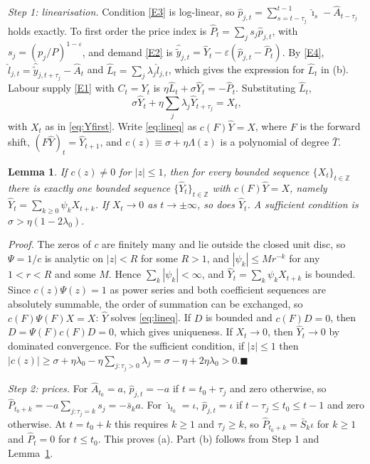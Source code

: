 \documentclass[11pt]{article}
\newtheorem{lemma}{Lemma}
\theoremstyle{definition}
\begin{document}
\emph{Step 1: linearisation.} Condition \eqref{E3} is log-linear, so
$\hat p_{j,t}=\sum_{s=t-\tau_j}^{t-1}\hat\imath_s-\hat A_{t-\tau_j}$ holds exactly. To first order the
price index is $\hat P_t=\sum_js_j\hat p_{j,t}$, with $s_j=(p_j/P)^{1-\varepsilon}$, and demand
\eqref{E2} is $\hat{\tilde y}_{j,t}=\hat Y_t-\varepsilon(\hat p_{j,t}-\hat P_t)$. By \eqref{E4},
$\hat l_{j,t}=\hat{\tilde y}_{j,t+\tau_j}-\hat A_t$ and $\hat L_t=\sum_j\lambda_j\hat l_{j,t}$, which gives the
expression for $\hat L_t$ in (b). Labour supply \eqref{E1} with $C_t=Y_t$ is
$\eta\hat L_t+\sigma\hat Y_t=-\hat P_t$. Substituting $\hat L_t$,
\begin{equation}\label{eq:lineq}
  \sigma\hat Y_t+\eta\sum_j\lambda_j\hat Y_{t+\tau_j}=X_t ,
\end{equation}
with $X_t$ as in \eqref{eq:Yfirst}. Write \eqref{eq:lineq} as $c(F)\hat Y=X$, where $F$ is the forward
shift, $(F\hat Y)_t=\hat Y_{t+1}$, and $c(z)\equiv\sigma+\eta\Lambda(z)$ is a polynomial of degree $\bar T$.

\begin{lemma}\label{lem:op}
If $c(z)\neq0$ for $|z|\le1$, then for every bounded sequence $\{X_t\}_{t\in\mathbb Z}$ there is exactly one
bounded sequence $\{\hat Y_t\}_{t\in\mathbb Z}$ with $c(F)\hat Y=X$, namely
$\hat Y_t=\sum_{k\ge0}\psi_kX_{t+k}$. If $X_t\to0$ as $t\to\pm\infty$, so does $\hat Y_t$. A sufficient
condition is $\sigma>\eta(1-2\lambda_0)$.
\end{lemma}

\noindent\emph{Proof.} The zeros of $c$ are finitely many and lie outside the closed unit disc, so
$\Psi=1/c$ is analytic on $|z|<R$ for some $R>1$, and $|\psi_k|\le Mr^{-k}$ for any $1<r<R$ and some
$M$. Hence $\sum_k|\psi_k|<\infty$, and $\hat Y_t=\sum_k\psi_kX_{t+k}$ is bounded. Since $c(z)\Psi(z)=1$
as power series and both coefficient sequences are absolutely summable, the order of summation can
be exchanged, so $c(F)\Psi(F)X=X$: $\hat Y$ solves \eqref{eq:lineq}. If $D$ is bounded and $c(F)D=0$, then
$D=\Psi(F)c(F)D=0$, which gives uniqueness. If $X_t\to0$, then $\hat Y_t\to0$ by dominated
convergence. For the sufficient condition, if $|z|\le1$ then
$|c(z)|\ge\sigma+\eta\lambda_0-\eta\sum_{j:\tau_j>0}\lambda_j=\sigma-\eta+2\eta\lambda_0>0$.\hfill$\blacksquare$

\medskip
\emph{Step 2: prices.} For $\hat A_{t_0}=a$, $\hat p_{j,t}=-a$ if $t=t_0+\tau_j$ and zero otherwise, so
$\hat P_{t_0+k}=-a\sum_{j:\tau_j=k}s_j=-\bar s_ka$. For $\hat\imath_{t_0}=\iota$,
$\hat p_{j,t}=\iota$ if $t-\tau_j\le t_0\le t-1$ and zero otherwise. At $t=t_0+k$ this requires $k\ge1$
and $\tau_j\ge k$, so $\hat P_{t_0+k}=\bar S_k\iota$ for $k\ge1$ and $\hat P_t=0$ for $t\le t_0$. This
proves (a). Part (b) follows from Step 1 and Lemma~\ref{lem:op}.
\end{document}
